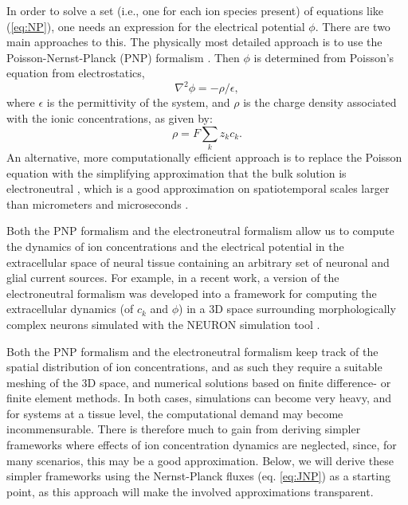 \documentclass[preprint,11pt,authoryear]{elsarticle}
\begin{document}
In order to solve a set (i.e., one for each ion species present) of equations like (\ref{eq:NP}), one needs an expression for the electrical potential $\phi$. There are two main approaches to this. The physically most detailed approach is to use the Poisson-Nernst-Planck (PNP) formalism \citep{Leonetti1998, Leonetti2004, Lu2007, Lopreore2008, Nanninga2008, Pods2013, Gardner2015}. Then $\phi$ is determined from Poisson's equation from electrostatics, 
\begin{equation}
\nabla^2 \phi = -\rho/\epsilon, 
\label{eq:poisson}
\end{equation}
where $\epsilon$ is the permittivity of the system, and $\rho$ is the charge density associated with the ionic concentrations, as given by:
\begin{equation}
\rho = F \sum_k z_k c_k.
\label{eq:poisson}
\end{equation}
An alternative, more computationally efficient approach is to replace the Poisson equation with the simplifying approximation that the bulk solution is electroneutral \citep{Mori2008, Mori2009, Mori2009a, Mori2011, Halnes2015, Halnes2013, Halnes2015arxiv, Pods2017, Niederer2013, OConnell2016, Solbra2018}, which is a good approximation on spatiotemporal scales larger than micrometers and microseconds \citep{Grodzinsky2011, Pods2017, Solbra2018}. 

Both the PNP formalism and the electroneutral formalism allow us to compute the dynamics of ion concentrations and the electrical potential in the extracellular space of neural tissue containing an arbitrary set of neuronal and glial current sources. For example, in a recent work, a version of the electroneutral formalism was developed into a framework for computing the extracellular dynamics (of $c_k$ and $\phi$) in a 3D space surrounding morphologically complex neurons simulated with the NEURON simulation tool \citep{Solbra2018}. 

Both the PNP formalism and the electroneutral formalism keep track of the spatial distribution of ion concentrations, and as such they require a suitable meshing of the 3D space, and numerical solutions based on finite difference- or finite element methods. In both cases, simulations can become very heavy, and for systems at a tissue level, the computational demand may become incommensurable. There is therefore much to gain from deriving simpler frameworks where effects of ion concentration dynamics are neglected, since, for many scenarios, this may be a good approximation. Below, we will derive these simpler frameworks using the Nernst-Planck fluxes (eq. \ref{eq:JNP}) as a starting point, as this approach will make the involved approximations transparent.
\end{document}
